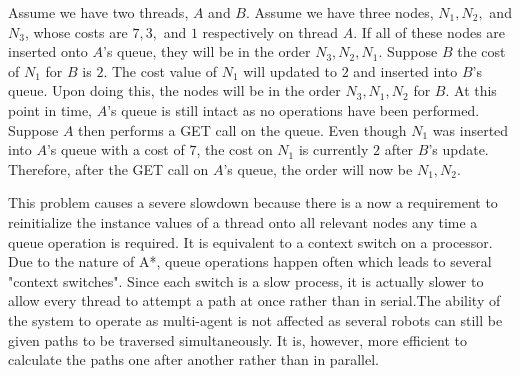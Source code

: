 Assume we have two threads, $A$ and $B$. Assume we have three nodes, $N_1, N_2,$ and $N_3$, whose costs are $7, 3,$ and $1$ respectively on thread $A$. If all of these nodes are inserted onto $A$'s queue, they will be in the order ${N_3, N_2, N_1}$. Suppose $B$ the cost of $N_1$ for $B$ is $2$. The cost value of $N_1$ will updated to $2$ and inserted into $B$'s queue. Upon doing this, the nodes will be in the order ${N_3, N_1, N_2}$ for $B$. At this point in time, $A$'s queue is still intact as no operations have been performed. Suppose $A$ then performs a GET call on the queue. Even though $N_1$ was inserted into $A$'s queue with a cost of $7$, the cost on $N_1$ is currently $2$ after $B$'s update. Therefore, after the GET call on $A$'s queue, the order will now be ${N_1, N_2}$. 

This problem causes a severe slowdown because there is a now a requirement to reinitialize the instance values of a thread onto all relevant nodes any time a queue operation is required. It is equivalent to a context switch on a processor. Due to the nature of A*, queue operations happen often which leads to several "context switches". Since each switch is a slow process, it is actually slower to allow every thread to attempt a path at once rather than in serial.The ability of the system to operate as multi-agent is not affected as several robots can still be given paths to be traversed simultaneously. It is, however, more efficient to calculate the paths one after another rather than in parallel.